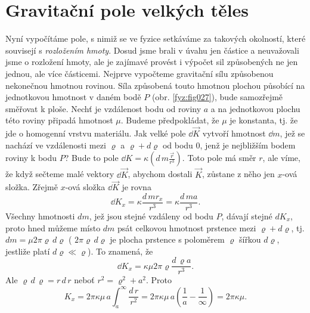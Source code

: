    
  \section{Gravitační pole velkých těles}
    Nyní vypočítáme pole, s nimiž se ve fyzice setkáváme za takových okolností, které souvisejí s 
    \emph{rozložením hmoty}. Dosud jsme brali v úvahu jen částice a neuvažovali jsme o rozložení 
    hmoty, ale je zajímavé provést i výpočet sil způsobených ne jen jednou, ale více částicemi. 
    Nejprve vypočteme gravitační sílu způsobenou nekonečnou hmotnou rovinou. Síla způsobená touto 
    hmotnou plochou působící na jednotkovou hmotnost v daném bodě \(P\) (obr. \ref{fyz:fig027}), 
    bude samozřejmě směřovat k ploše. Nechť je vzdálenost bodu od roviny \(a\) a na jednotkovou 
    plochu této roviny připadá hmotnost \(\mu\). Budeme předpokládat, že \(\mu\) je konstanta, tj. 
    že jde o homogenní vrstvu materiálu. Jak velké pole \(\dd{\vec{K}}\) vytvoří hmotnost 
    \(\dd{m}\), jež se nachází ve vzdálenosti mezi \(\varrho\) a \(\varrho +d\varrho\) od bodu 
    \(0\), jenž je nejbližším bodem roviny k bodu \(P\)? Bude to pole \(\dd{K} = 
    \kappa(d\,m\frac{\vec{r}}{r^3})\). Toto pole má směr \(r\), ale víme, že když sečteme malé 
    vektory \(\dd{\vec{K}}\), abychom dostali \(\vec{K}\), zůstane z něho jen \(x\)-ová složka. 
    Zřejmě \(x\)-ová složka \(\dd{\vec{K}}\) je rovna
    \begin{equation}\label{FYZ:eq046}
      \dd{K_x} = \kappa\frac{d\,mr_x}{r^3} = \kappa\frac{d\,ma}{r^3}.
    \end{equation}
    Všechny hmotnosti \(dm\), jež jsou stejné vzdáleny od bodu \(P\), dávají stejné \(dK_x\), proto 
    hned můžeme místo \(dm\) psát celkovou hmotnost prstence mezi \(\varrho +d\varrho\), tj. 
    \(dm=\mu2\pi\varrho\,d\varrho\) ( \(2\pi\varrho\,d\varrho\) je plocha prstence s poloměrem 
    \(\varrho\) šířkou \(d\varrho\), jestliže platí \(d\varrho \ll \varrho\)). To znamená, že
    \begin{equation}\label{FYZ:eq047}
      \dd{K_x} = \kappa\mu2\pi\varrho\frac{d\,\varrho a}{r^3}.
    \end{equation}
    Ale \(\varrho\,d\,\varrho = r\,d\,r\) neboť \(r^2 = \varrho^2 + a^2\). Proto
    \begin{equation}\label{FYZ:eq048}
      K_x = 2\pi\kappa\mu\,a\int_a^\infty\frac{d\,r}{r^2}
          = 2\pi\kappa\mu\,a\left(\frac{1}{a} - \frac{1}{\infty}\right) = 2\pi\kappa\mu.
    \end{equation}

